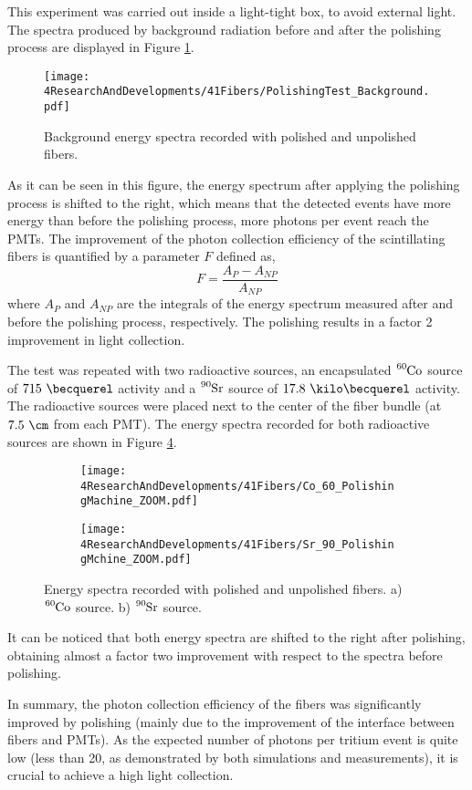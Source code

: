 This experiment was carried out inside a light-tight box, to avoid external light. The spectra produced by background radiation before and after the polishing process are displayed in Figure \ref{fig:ResultsOfPolishingMachineBackground}.
\begin{figure}[]
\centering
\texttt{[image: 4ResearchAndDevelopments/41Fibers/PolishingTest\_Background.pdf]}
\caption{Background energy spectra recorded with polished and unpolished fibers.\label{fig:ResultsOfPolishingMachineBackground}}
\end{figure}
As it can be seen in this figure, the energy spectrum after applying the polishing process is shifted to the right, which means that the detected events have more energy than before the polishing process, more photons per event reach the PMTs. The improvement of the photon collection efficiency of the scintillating fibers is quantified by a parameter $F$ defined as,
\begin{equation}
F=\frac{A_{P}-A_{NP}}{A_{NP}}
\label{eq:RelativeImprovement}
\end{equation}
where $A_{P}$ and $A_{NP}$ are the integrals of the energy spectrum measured after and before the polishing process, respectively. The polishing results in a factor 2 improvement in light collection. 

The test was repeated with two radioactive sources, an encapsulated $\ce{^{60}Co}$ source of $715~\becquerel$ activity and a $\ce{^{90}Sr}$ source of $17.8~\kilo\becquerel$ activity. The radioactive sources were placed next to the center of the fiber bundle (at $7.5~\cm$ from each PMT). The energy spectra recorded for both radioactive sources are shown in Figure \ref{fig:ResultsOfPolishingMachineSources}.
\begin{figure}
\centering
    \begin{subfigure}[b]{1\textwidth}
    \centering
    \texttt{[image: 4ResearchAndDevelopments/41Fibers/Co\_60\_PolishingMachine\_ZOOM.pdf]}  
    \caption{\label{subfig:EnergySpectrumCo60PolishingTest}}
    \end{subfigure}
    \hfill
    \begin{subfigure}[b]{1\textwidth}
    \centering
    \texttt{[image: 4ResearchAndDevelopments/41Fibers/Sr\_90\_PolishingMchine\_ZOOM.pdf]}  
    \caption{\label{subfig:EnergySpectrumSr90PolishingTest}}
    \end{subfigure}
 \caption{Energy spectra recorded with polished and unpolished fibers. a) $\ce{^{60}Co}$ source. b) $\ce{^{90}Sr}$ source.}
 \label{fig:ResultsOfPolishingMachineSources}
\end{figure}
It can be noticed that both energy spectra are shifted to the right after polishing, obtaining almost a factor two improvement with respect to the spectra before polishing. 

In summary, the photon collection efficiency of the fibers was significantly improved by polishing (mainly due to the improvement of the interface between fibers and PMTs). As the expected number of photons per tritium event is quite low (less than 20, as demonstrated by both simulations and measurements), it is crucial to achieve a high light collection.
